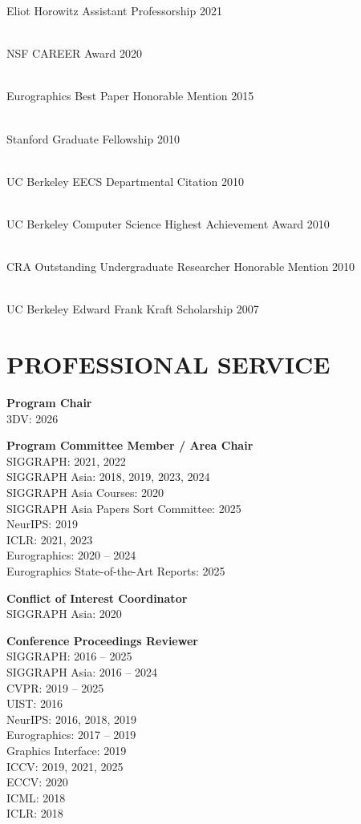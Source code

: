 \documentclass[line,margin]{res}
\begin{document}
\begin{resume}
\newcommand{\award}[2] {
	#1 \hfill #2
}

\award
{Eliot Horowitz Assistant Professorship}
{2021}
\\
\award
{NSF CAREER Award}
{2020}
\\
\award
{Eurographics Best Paper Honorable Mention}
{2015}
\\
\award
{Stanford Graduate Fellowship}
{2010}
\\
\award
{UC Berkeley EECS Departmental Citation}
{2010}
\\
\award
{UC Berkeley Computer Science Highest Achievement Award}
{2010}
\\
\award
{CRA Outstanding Undergraduate Researcher Honorable Mention}
{2010}
\\
\award
{UC Berkeley Edward Frank Kraft Scholarship}
{2007}


\section{PROFESSIONAL SERVICE}

\textbf{Program Chair}\\
3DV: 2026

\textbf{Program Committee Member / Area Chair}\\
SIGGRAPH: 2021, 2022\\
SIGGRAPH Asia: 2018, 2019, 2023, 2024\\
SIGGRAPH Asia Courses: 2020\\
SIGGRAPH Asia Papers Sort Committee: 2025\\
NeurIPS: 2019\\
ICLR: 2021, 2023\\
Eurographics: 2020 -- 2024\\
Eurographics State-of-the-Art Reports: 2025

\textbf{Conflict of Interest Coordinator}\\
SIGGRAPH Asia: 2020

\textbf{Conference Proceedings Reviewer}\\
SIGGRAPH: 2016 -- 2025\\
SIGGRAPH Asia: 2016 -- 2024\\
CVPR: 2019 -- 2025\\
UIST: 2016\\
NeurIPS: 2016, 2018, 2019\\
Eurographics: 2017 --  2019\\
Graphics Interface: 2019\\
ICCV: 2019, 2021, 2025\\
ECCV: 2020\\
ICML: 2018\\
ICLR: 2018


\end{resume}
\end{document}
